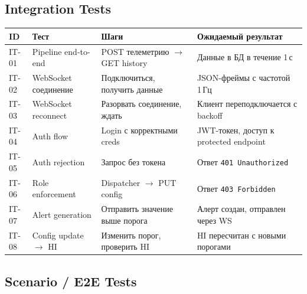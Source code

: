 \documentclass[12pt,a4paper]{article}
\newcommand{\code}[1]{\texttt{#1}}
\begin{document}
\subsection{Integration Tests}

\begin{longtable}{l L{3.5cm} L{4cm} L{4cm}}
\toprule
\textbf{ID} & \textbf{Тест} & \textbf{Шаги} & \textbf{Ожидаемый результат} \\
\midrule
\endhead
IT-01 & Pipeline end-to-end & POST телеметрию $\to$ GET history & Данные в БД в течение 1\,с \\
IT-02 & WebSocket соединение & Подключиться, получить данные & JSON-фреймы с частотой 1\,Гц \\
IT-03 & WebSocket reconnect & Разорвать соединение, ждать & Клиент переподключается с backoff \\
IT-04 & Auth flow & Login с корректными creds & JWT-токен, доступ к protected endpoint \\
IT-05 & Auth rejection & Запрос без токена & Ответ \code{401 Unauthorized} \\
IT-06 & Role enforcement & Dispatcher $\to$ PUT config & Ответ \code{403 Forbidden} \\
IT-07 & Alert generation & Отправить значение выше порога & Алерт создан, отправлен через WS \\
IT-08 & Config update $\to$ HI & Изменить порог, проверить HI & HI пересчитан с новыми порогами \\
\bottomrule
\end{longtable}

\subsection{Scenario / E2E Tests}
\end{document}
